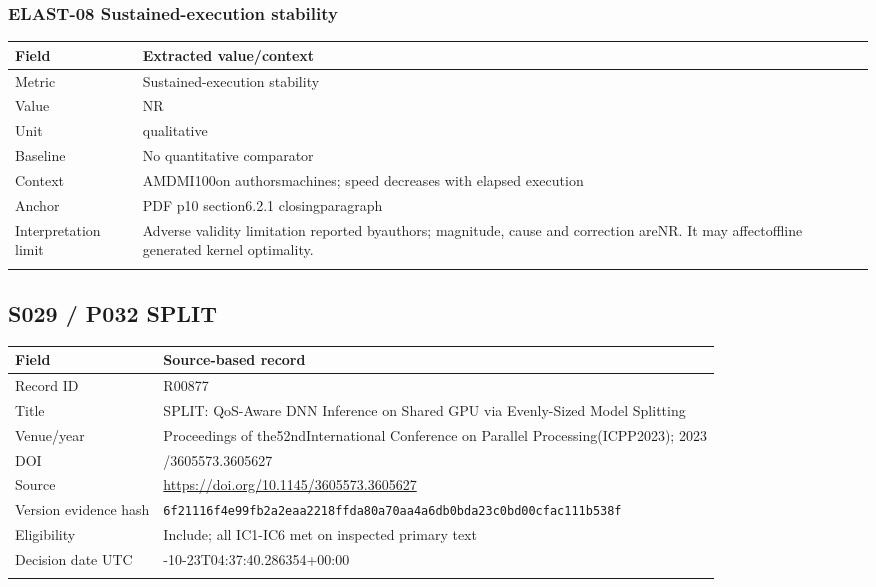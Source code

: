 \subsubsection*{ELAST-08 Sustained-execution stability}
\begin{longtable}{>{\raggedright\arraybackslash}p{}>{\raggedright\arraybackslash}p{}}
\toprule
\textbf{Field} & \textbf{Extracted value/context}\\\midrule\endhead
Metric & Sustained-execution stability\\\addlinespace
Value & NR\\\addlinespace
Unit & qualitative\\\addlinespace
Baseline & No quantitative comparator\\\addlinespace
Context & AMDMI100on authorsmachines;\allowbreak{} speed decreases with elapsed execution\\\addlinespace
Anchor & PDF p10 section6.2.1 closingparagraph\\\addlinespace
Interpretation limit & Adverse validity limitation reported byauthors;\allowbreak{} magnitude,\allowbreak{} cause and correction areNR. It may affectoffline generated kernel optimality.\\\addlinespace
\bottomrule\end{longtable}
\clearpage\subsection{S029 / P032 SPLIT}
\cite{s029}
\begin{longtable}{>{\raggedright\arraybackslash}p{}>{\raggedright\arraybackslash}p{}}
\toprule
\textbf{Field} & \textbf{Source-based record}\\\midrule\endhead
Record ID & R00877\\\addlinespace
Title & SPLIT: QoS-Aware DNN Inference on Shared GPU via Evenly-Sized Model Splitting\\\addlinespace
Venue/year & Proceedings of the52ndInternational Conference on Parallel Processing(ICPP2023);\allowbreak{} 2023\\\addlinespace
DOI & 10.1145/3605573.3605627\\\addlinespace
Source & \url{https://doi.org/10.1145/3605573.3605627}\\\addlinespace
Version evidence hash & \nolinkurl{6f21116f4e99fb2a2eaa2218ffda80a70aa4a6db0bda23c0bd00cfac111b538f}\\\addlinespace
Eligibility & Include;\allowbreak{} all IC1-IC6 met on inspected primary text\\\addlinespace
Decision date UTC & 2026-10-23T04:37:40.286354+00:00\\\addlinespace
\bottomrule\end{longtable}

